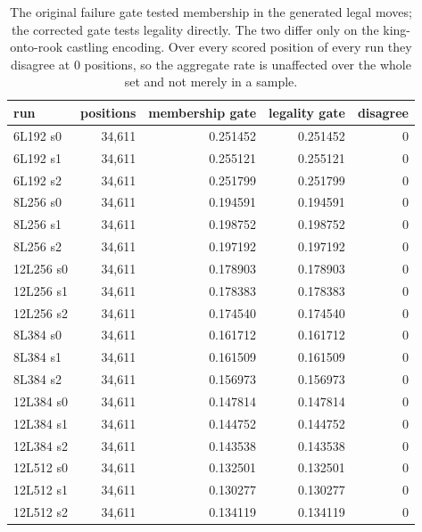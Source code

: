 \documentclass[11pt]{article}
\begin{document}
\begin{table}[htbp]
\centering\small
\caption{The original failure gate tested membership in the generated legal moves; the corrected gate tests legality directly. The two differ only on the king-onto-rook castling encoding. Over every scored position of every run they disagree at 0 positions, so the aggregate rate is unaffected over the whole set and not merely in a sample.}
\label{tab:s-gates}
\begin{tabular}{lrrrr}
\toprule
run & positions & membership gate & legality gate & disagree \\
\midrule
6L192 s0 & 34,611 & 0.251452 & 0.251452 & 0 \\
6L192 s1 & 34,611 & 0.255121 & 0.255121 & 0 \\
6L192 s2 & 34,611 & 0.251799 & 0.251799 & 0 \\
8L256 s0 & 34,611 & 0.194591 & 0.194591 & 0 \\
8L256 s1 & 34,611 & 0.198752 & 0.198752 & 0 \\
8L256 s2 & 34,611 & 0.197192 & 0.197192 & 0 \\
12L256 s0 & 34,611 & 0.178903 & 0.178903 & 0 \\
12L256 s1 & 34,611 & 0.178383 & 0.178383 & 0 \\
12L256 s2 & 34,611 & 0.174540 & 0.174540 & 0 \\
8L384 s0 & 34,611 & 0.161712 & 0.161712 & 0 \\
8L384 s1 & 34,611 & 0.161509 & 0.161509 & 0 \\
8L384 s2 & 34,611 & 0.156973 & 0.156973 & 0 \\
12L384 s0 & 34,611 & 0.147814 & 0.147814 & 0 \\
12L384 s1 & 34,611 & 0.144752 & 0.144752 & 0 \\
12L384 s2 & 34,611 & 0.143538 & 0.143538 & 0 \\
12L512 s0 & 34,611 & 0.132501 & 0.132501 & 0 \\
12L512 s1 & 34,611 & 0.130277 & 0.130277 & 0 \\
12L512 s2 & 34,611 & 0.134119 & 0.134119 & 0 \\
\bottomrule
\end{tabular}
\end{table}
\end{document}
